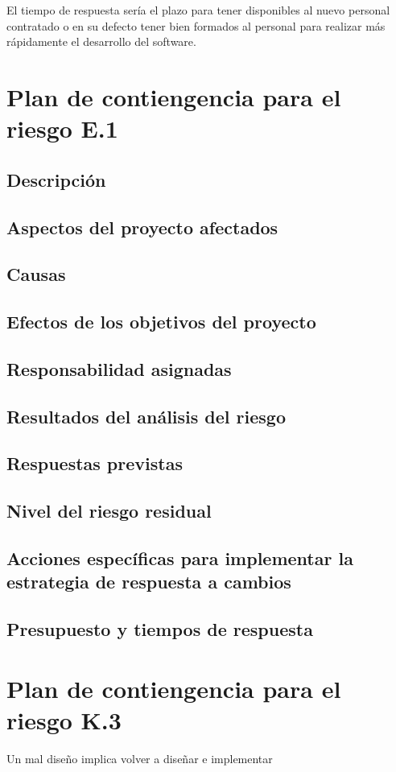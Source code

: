 \documentclass[11pt,a4paper,spanish,twoside]{report}
\begin{document}
El tiempo de respuesta sería el plazo para tener disponibles al nuevo
personal contratado o en su defecto tener bien formados al personal para
realizar más rápidamente el desarrollo del software.

\section{Plan de contiengencia para el riesgo E.1}
\subsection{Descripción}
\subsection{Aspectos del proyecto afectados}
\subsection{Causas}
\subsection{Efectos de los objetivos del proyecto}
\subsection{Responsabilidad asignadas}
\subsection{Resultados del análisis del riesgo}
\subsection{Respuestas previstas}
\subsection{Nivel del riesgo residual}
\subsection{Acciones específicas para implementar la estrategia de respuesta
a cambios}
\subsection{Presupuesto y tiempos de respuesta}

\section{Plan de contiengencia para el riesgo K.3}
Un mal diseño implica volver a diseñar e implementar
\end{document}
